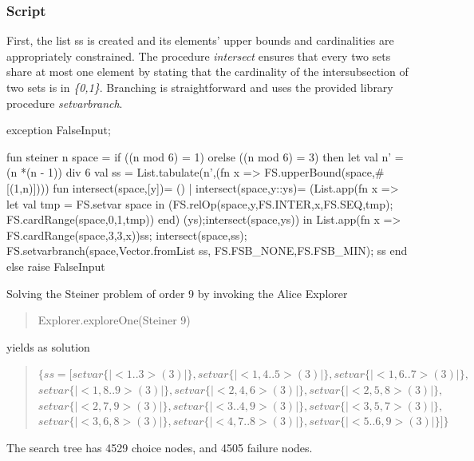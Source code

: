 \documentclass[a4paper]{scrartcl}
\begin{document}
\subsubsection{Script}
First, the list ss is created and its elements' upper bounds 
and cardinalities are appropriately constrained. 
The procedure {\it intersect} ensures
that every two sets share at most one element by stating that 
the cardinality of the intersubsection of two sets is in {\it \{0,1\}}. 
Branching is straightforward and uses the provided library 
procedure {\it setvarbranch}.
  
\begin{myverbatim}
exception FalseInput;

fun steiner n space  = 
   if ((n mod 6) = 1) orelse ((n mod 6) = 3)
   then
    let 
       val n' = (n *(n - 1)) div 6
       val ss = List.tabulate(n',(fn x => 
                  FS.upperBound(space,#[(1,n)])))
       fun intersect(space,[y])= ()
         | intersect(space,y::ys)= (List.app(fn x =>
              let 
                 val tmp = FS.setvar space
              in       
                (FS.relOp(space,y,FS.INTER,x,FS.SEQ,tmp);
                 FS.cardRange(space,0,1,tmp))
             end)
                (ys);intersect(space,ys))
    in
       List.app(fn x => FS.cardRange(space,3,3,x))ss;
       intersect(space,ss);
       FS.setvarbranch(space,Vector.fromList ss,
                             FS.FSB_NONE,FS.FSB_MIN);    
       ss
    end
    else                 
     raise FalseInput 
\end{myverbatim}


Solving the Steiner problem of order 9 by invoking the Alice 
Explorer 
\begin{quote}
Explorer.exploreOne(Steiner 9)
\end{quote}
yields as solution 
\begin{quote}
$\{ss = [setvar\{|<1..3> (3)|\}, setvar\{|<1, 4..5> (3)|\},setvar\{|<1, 6..7> (3)|\},$ \\
$       setvar\{|<1, 8..9> (3)|\}, setvar\{|<2, 4, 6> (3)|\},  setvar\{|<2, 5, 8> (3)|\},$\\
$  setvar\{|<2, 7, 9> (3)|\},  setvar\{|<3..4, 9> (3)|\},  setvar\{|<3, 5, 7> (3)|\}, $\\
$ setvar\{|<3, 6, 8> (3)|\},  setvar\{|<4, 7..8> (3)|\},  setvar\{|<5..6, 9> (3)|\}]\}$
\end{quote}
The search tree has 4529 choice nodes, and 4505 
failure nodes. 
\end{document}
